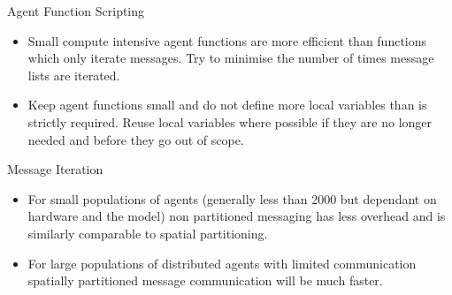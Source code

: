 \documentclass[11pt, a4paper, onecolumn, oneside]{report}
\begin{document}
Agent Function Scripting

\begin{itemize}
    \item Small compute intensive agent functions are more efficient than functions which only iterate messages.
        Try to minimise the number of times message lists are iterated.
    \item Keep agent functions small and do not define more local variables than is strictly required.
        Reuse local variables where possible if they are no longer needed and before they go out of scope.
\end{itemize}

Message Iteration

\begin{itemize}
    \item For small populations of agents (generally less than 2000 but dependant on hardware and the model) non partitioned messaging has less overhead and is similarly comparable to spatial partitioning.
    \item For large populations of distributed agents with limited communication spatially partitioned message communication will be much faster.
\end{itemize}

% 
\end{document}

